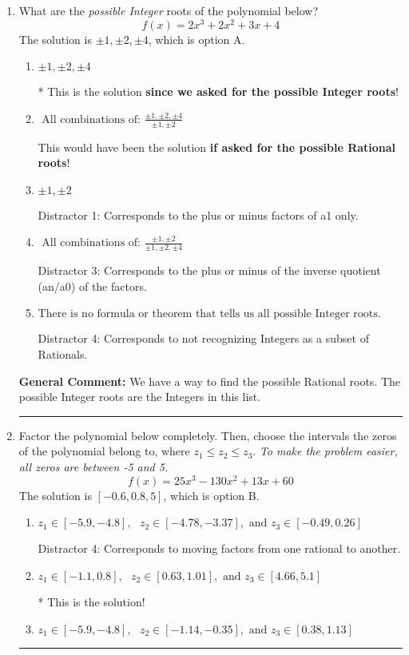 \documentclass{extbook}[14pt]
\newcommand{\litem}[1]{\item #1

\rule{\textwidth}{0.4pt}}
\begin{document}
\begin{enumerate}\litem{
What are the \textit{possible Integer} roots of the polynomial below?
\[ f(x) = 2x^{3} +2 x^{2} +3 x + 4 \]The solution is \( \pm 1,\pm 2,\pm 4 \), which is option A.\begin{enumerate}[label=\Alph*.]
\item \( \pm 1,\pm 2,\pm 4 \)

* This is the solution \textbf{since we asked for the possible Integer roots}!
\item \( \text{ All combinations of: }\frac{\pm 1,\pm 2,\pm 4}{\pm 1,\pm 2} \)

This would have been the solution \textbf{if asked for the possible Rational roots}!
\item \( \pm 1,\pm 2 \)

 Distractor 1: Corresponds to the plus or minus factors of a1 only.
\item \( \text{ All combinations of: }\frac{\pm 1,\pm 2}{\pm 1,\pm 2,\pm 4} \)

 Distractor 3: Corresponds to the plus or minus of the inverse quotient (an/a0) of the factors. 
\item \( \text{There is no formula or theorem that tells us all possible Integer roots.} \)

 Distractor 4: Corresponds to not recognizing Integers as a subset of Rationals.
\end{enumerate}

\textbf{General Comment:} We have a way to find the possible Rational roots. The possible Integer roots are the Integers in this list.
}
\litem{
Factor the polynomial below completely. Then, choose the intervals the zeros of the polynomial belong to, where $z_1 \leq z_2 \leq z_3$. \textit{To make the problem easier, all zeros are between -5 and 5.}
\[ f(x) = 25x^{3} -130 x^{2} +13 x + 60 \]The solution is \( [-0.6, 0.8, 5] \), which is option B.\begin{enumerate}[label=\Alph*.]
\item \( z_1 \in [-5.9, -4.8], \text{   }  z_2 \in [-4.78, -3.37], \text{   and   } z_3 \in [-0.49, 0.26] \)

 Distractor 4: Corresponds to moving factors from one rational to another.
\item \( z_1 \in [-1.1, 0.8], \text{   }  z_2 \in [0.63, 1.01], \text{   and   } z_3 \in [4.66, 5.1] \)

* This is the solution!
\item \( z_1 \in [-5.9, -4.8], \text{   }  z_2 \in [-1.14, -0.35], \text{   and   } z_3 \in [0.38, 1.13] \)


\end{enumerate}}
\end{enumerate}
\end{document}

